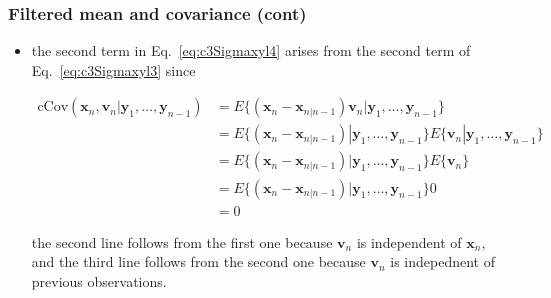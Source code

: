 \begin{comment}
\end{comment}

\begin{frame}
    \frametitle{Filtered mean and covariance (cont)}
    \scriptsize

    \begin{itemize}

        \item the second term in Eq.~\ref{eq:c3Sigmaxyl4} arises from the
            second
            term of Eq.~\ref{eq:c3Sigmaxyl3} since

            \begin{align*}
                \text{cCov}(\mathbf{x}_n,\mathbf{v}_n|\mathbf{y}_1,\ldots,\mathbf{y}_{n-1})&=E\{(\mathbf{x}_n-\mathbf{x}_{n|n-1})\mathbf{v}_n|\mathbf{y}_1,\ldots,\mathbf{y}_{n-1}\}\\
                                                                                           &=E\{(\mathbf{x}_n-\mathbf{x}_{n|n-1})|\mathbf{y}_1,\ldots,\mathbf{y}_{n-1}\}E\{\mathbf{v}_n|\mathbf{y}_1,\ldots,\mathbf{y}_{n-1}\}\\
                                                                                           &=E\{(\mathbf{x}_n-\mathbf{x}_{n|n-1})|\mathbf{y}_1,\ldots,\mathbf{y}_{n-1}\}E\{\mathbf{v}_n\}\\
                                                                                           &=E\{(\mathbf{x}_n-\mathbf{x}_{n|n-1})|\mathbf{y}_1,\ldots,\mathbf{y}_{n-1}\}0\\
                                                                                           &=0
            \end{align*}

            the second line follows from the first one because $\mathbf{v}_n$
            is independent of $\mathbf{x}_n$, and the third line follows from
            the second one because $\mathbf{v}_n$ is indepednent of previous
            observations.

    \end{itemize}
    \normalsize
\end{frame}

